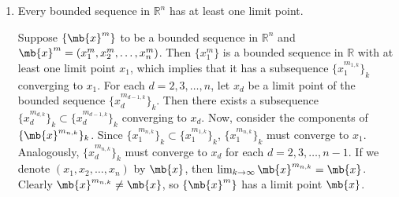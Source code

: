\begin{exercise}
\begin{enumerate}
		\item Every bounded sequence in $\mathbb{R}^n$ has at least one limit point.

			\begin{solution}
				Suppose $\{\mb{x}^m\}$ to be a bounded sequence in $\mathbb{R}^n$ and $\mb{x}^m = (x_1^m,x_2^m,\ldots,x_n^m)$.
				Then $\{x_1^m\}$ is a bounded sequence in $\mathbb{R}$ with at least one limit point $x_1$, which implies that it has a subsequence $\{x_1^{m_{1,k}}\}_k$ converging to $x_1$.
				For each $d = 2,3,\dots,n$, let $x_d$ be a limit point of the bounded sequence $\{x_d^{m_{d-1,k}}\}_k$.
				Then there exists a subsequence $\{x_d^{m_{d,k}}\}_k \subset \{x_d^{m_{d-1,k}}\}_k$ converging to $x_d$.
				Now, consider the components of $\{\mb{x}^{m_{n,k}}\}_k$.
				Since $\{x_1^{m_{n,k}}\}_k\subset \{x_1^{m_{1,k}}\}_k$, $\{x_1^{m_{n,k}}\}_k$ must converge to $x_1$.
				Analogously, $\{x_d^{m_{n,k}}\}_k$ must converge to $x_d$ for each $d = 2,3,\dots,n-1$.
				If we denote $(x_1,x_2,\dots,x_n)$ by $\mb{x}$, then  $\lim_{k\to\infty}\mb{x}^{m_{n,k}}=\mb{x}$.
				Clearly $\mb{x}^{m_{n,k}} \neq \mb{x}$, so $\{\mb{x}^m\}$ has a limit point $\mb{x}$.
				\qedhere
			\end{solution}

	\end{enumerate}
\end{exercise}



